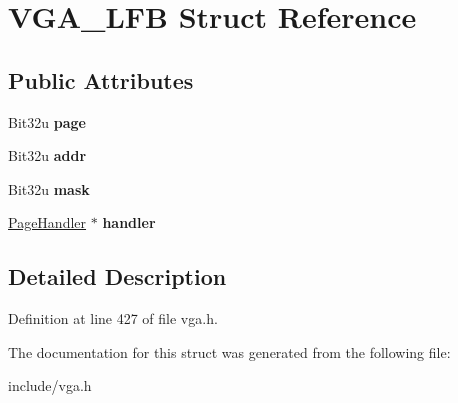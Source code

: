 \hypertarget{structVGA__LFB}{\section{V\-G\-A\-\_\-\-L\-F\-B Struct Reference}
\label{structVGA__LFB}
}
\subsection*{Public Attributes}
\begin{DoxyCompactItemize}
\item 
\hypertarget{structVGA__LFB_ac33c6c75c1e64552c88293115b1c1196}{Bit32u {\bfseries page}}\label{structVGA__LFB_ac33c6c75c1e64552c88293115b1c1196}

\item 
\hypertarget{structVGA__LFB_ad82dd223ea49e44ed0958ff21ae15f1d}{Bit32u {\bfseries addr}}\label{structVGA__LFB_ad82dd223ea49e44ed0958ff21ae15f1d}

\item 
\hypertarget{structVGA__LFB_aaf0a31db50d61b55ed20a81fb94de57c}{Bit32u {\bfseries mask}}\label{structVGA__LFB_aaf0a31db50d61b55ed20a81fb94de57c}

\item 
\hypertarget{structVGA__LFB_ac84a223414c76edc5fbd6742bfd8c720}{\hyperlink{classPageHandler}{Page\-Handler} $\ast$ {\bfseries handler}}\label{structVGA__LFB_ac84a223414c76edc5fbd6742bfd8c720}

\end{DoxyCompactItemize}


\subsection{Detailed Description}


Definition at line 427 of file vga.\-h.



The documentation for this struct was generated from the following file\-:\begin{DoxyCompactItemize}
\item 
include/vga.\-h\end{DoxyCompactItemize}
